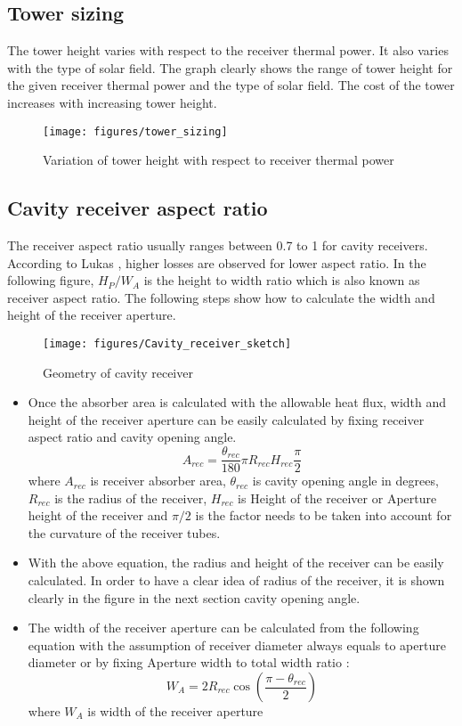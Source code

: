 \subsection{Tower sizing}
The tower height varies with respect to the receiver thermal power. It also varies with the type of solar field. The graph clearly shows the range of tower height for the given receiver thermal power and the type of solar field. The cost of the tower increases with increasing tower height. 
\begin{figure}[h]
	\texttt{[image: figures/tower\_sizing]}
	\centering
	\caption{Variation of tower height with respect to receiver thermal power}
\end{figure}
\subsection{Cavity receiver aspect ratio}
The receiver aspect ratio usually ranges between 0.7 to 1 for cavity receivers. According to Lukas \cite{Feierabend.2010}, higher losses are observed for lower aspect ratio. In the following figure, $ {H_P}/{W_A} $ is the height to width ratio which is also known as receiver aspect ratio. The following steps show how to calculate the width and height of the receiver aperture.
\begin{figure}[h]
	\texttt{[image: figures/Cavity\_receiver\_sketch]}
	\centering
	\caption{Geometry of cavity receiver}	
\end{figure}
\begin{itemize}
\item Once the absorber area is calculated with the allowable heat flux, width and height of the receiver aperture can be easily calculated by fixing receiver aspect ratio and cavity opening angle.
\begin{equation}
A_{rec} = \frac {\theta_{rec}}{180} \pi R_{rec} H_{rec}\frac {\pi}{2}
\end{equation}
where $ A_{rec} $ is receiver absorber area, $ \theta_{rec} $ is cavity opening angle in degrees, $ R_{rec} $ is the radius of the receiver, $ H_{rec} $ is Height of the receiver or Aperture height of the receiver and $ \pi / 2 $ is the factor needs to be taken into account for the curvature of the receiver tubes.
\item With the above equation, the radius and height of the receiver can be easily calculated. In order to have a clear idea of radius of the receiver, it is shown clearly in the figure in the next section cavity opening angle. \\ 
\item The width of the receiver aperture can be calculated from the following equation with the assumption of receiver diameter always equals to aperture diameter or by fixing Aperture width to total width ratio :
\begin{equation}
W_A = 2 R_{rec} \cos \left( \frac{\pi - \theta_{rec}}{2} \right)
\end{equation}
where $ W_A $ is width of the receiver aperture
\end{itemize}

